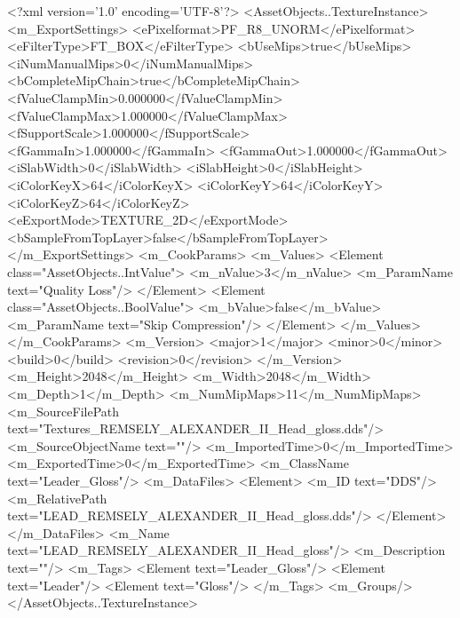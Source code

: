 <?xml version='1.0' encoding='UTF-8'?>
<AssetObjects..TextureInstance>
  <m_ExportSettings>
    <ePixelformat>PF_R8_UNORM</ePixelformat>
    <eFilterType>FT_BOX</eFilterType>
    <bUseMips>true</bUseMips>
    <iNumManualMips>0</iNumManualMips>
    <bCompleteMipChain>true</bCompleteMipChain>
    <fValueClampMin>0.000000</fValueClampMin>
    <fValueClampMax>1.000000</fValueClampMax>
    <fSupportScale>1.000000</fSupportScale>
    <fGammaIn>1.000000</fGammaIn>
    <fGammaOut>1.000000</fGammaOut>
    <iSlabWidth>0</iSlabWidth>
    <iSlabHeight>0</iSlabHeight>
    <iColorKeyX>64</iColorKeyX>
    <iColorKeyY>64</iColorKeyY>
    <iColorKeyZ>64</iColorKeyZ>
    <eExportMode>TEXTURE_2D</eExportMode>
    <bSampleFromTopLayer>false</bSampleFromTopLayer>
  </m_ExportSettings>
  <m_CookParams>
    <m_Values>
      <Element class="AssetObjects..IntValue">
        <m_nValue>3</m_nValue>
        <m_ParamName text="Quality Loss"/>
      </Element>
      <Element class="AssetObjects..BoolValue">
        <m_bValue>false</m_bValue>
        <m_ParamName text="Skip Compression"/>
      </Element>
    </m_Values>
  </m_CookParams>
  <m_Version>
    <major>1</major>
    <minor>0</minor>
    <build>0</build>
    <revision>0</revision>
  </m_Version>
  <m_Height>2048</m_Height>
  <m_Width>2048</m_Width>
  <m_Depth>1</m_Depth>
  <m_NumMipMaps>11</m_NumMipMaps>
  <m_SourceFilePath text="Textures\LEAD_REMSELY_ALEXANDER_II_Head_gloss.dds"/>
  <m_SourceObjectName text=""/>
  <m_ImportedTime>0</m_ImportedTime>
  <m_ExportedTime>0</m_ExportedTime>
  <m_ClassName text="Leader_Gloss"/>
  <m_DataFiles>
    <Element>
      <m_ID text="DDS"/>
      <m_RelativePath text="LEAD_REMSELY_ALEXANDER_II_Head_gloss.dds"/>
    </Element>
  </m_DataFiles>
  <m_Name text="LEAD_REMSELY_ALEXANDER_II_Head_gloss"/>
  <m_Description text=""/>
  <m_Tags>
    <Element text="Leader_Gloss"/>
    <Element text="Leader"/>
    <Element text="Gloss"/>
  </m_Tags>
  <m_Groups/>
</AssetObjects..TextureInstance>
